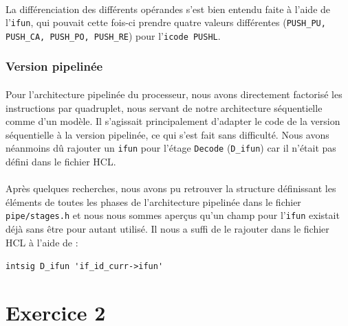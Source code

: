 \documentclass[12pt]{article}
\begin{document}
\paragraph{}La différenciation des différents opérandes s'est bien entendu faite à l'aide de l'\verb+ifun+, qui pouvait cette fois-ci prendre quatre valeurs différentes (\verb+PUSH_PU, PUSH_CA, PUSH_PO, PUSH_RE+) pour l'\verb+icode PUSHL+.

\subsubsection{Version pipelinée}
\paragraph{}Pour l'architecture pipelinée du processeur, nous avons directement factorisé les instructions par quadruplet, nous servant de notre architecture séquentielle comme d'un modèle. Il s'agissait principalement d'adapter le code de la version séquentielle à la version pipelinée, ce qui s'est fait sans difficulté. Nous avons néanmoins dû rajouter un \verb+ifun+ pour l'étage \verb+Decode+ (\verb+D_ifun+) car il n'était pas défini dans le fichier HCL.

\paragraph{}Après quelques recherches, nous avons pu retrouver la structure définissant les éléments de toutes les phases de l'architecture pipelinée dans le fichier \verb+pipe/stages.h+ et nous nous sommes aperçus qu'un champ pour l'\verb+ifun+ existait déjà sans être pour autant utilisé. Il nous a suffi de le rajouter dans le fichier HCL à l'aide de :

\verb+intsig D_ifun 'if_id_curr->ifun'+



\section{Exercice 2}
\end{document}
